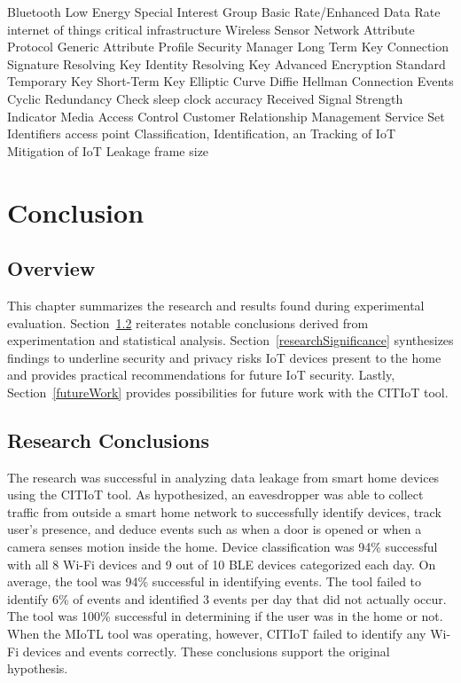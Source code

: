 \documentclass[12pt,letterpaper,oneside]{book}
\begin{document}
	\begin{acronym}
		 {Bluetooth Low Energy}
		 {Special Interest Group}
		 {Basic Rate/Enhanced Data Rate}
		 {internet of things}
		 {critical infrastructure}
		 {Wireless Sensor Network}
		 {Attribute Protocol}
		 {Generic Attribute Profile}
		 {Security Manager}
		 {Long Term Key}
		 {Connection Signature Resolving Key}
		 {Identity Resolving Key}
		 {Advanced Encryption Standard}
		 {Temporary Key}
		 {Short-Term Key}
		 {Elliptic Curve Diffie Hellman}
		 {Connection Events}
		 {Cyclic Redundancy Check}
		 {sleep clock accuracy}
		 {Received Signal Strength Indicator}
		 {Media Access Control}
		 {Customer Relationship Management}
		 {Service Set Identifiers}
		 {access point}
		 {Classification, Identification, an Tracking of \ac{IoT}}
		 {Mitigation of \ac{IoT} Leakage}
		 {frame size}
	\end{acronym}
\mainmatter
	\chapter{Conclusion}
	
		\section{Overview}
		This chapter summarizes the research and results found during experimental evaluation. Section~\ref{researchConclusions} reiterates notable conclusions derived from experimentation and statistical analysis. Section~\ref{researchSignificance} synthesizes findings to underline security and privacy risks \ac{IoT} devices present to the home and provides practical recommendations for future \ac{IoT} security. Lastly, Section~\ref{futureWork} provides possibilities for future work with the \ac{CITIoT} tool.
		
		\section{Research Conclusions} \label{researchConclusions}
		The research was successful in analyzing data leakage from smart home devices using the \ac{CITIoT} tool. As hypothesized, an eavesdropper was able to collect traffic from outside a smart home network to successfully identify devices, track user's presence, and deduce events such as when a door is opened or when a camera senses motion inside the home. Device classification was 94\% successful with all 8 Wi-Fi devices and 9 out of 10 \ac{BLE} devices categorized each day. On average, the tool was 94\% successful in identifying events. The tool failed to identify 6\% of events and identified 3 events per day that did not actually occur. The tool was 100\% successful in determining if the user was in the home or not. When the \ac{MIoTL} tool was operating, however, \ac{CITIoT} failed to identify any Wi-Fi devices and events correctly.  These conclusions support the original hypothesis.
		
\end{document}
